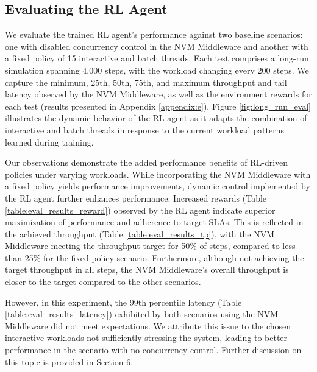 \subsection*{Evaluating the RL Agent}

We evaluate the trained RL agent's performance against two baseline scenarios: one with disabled concurrency control in the NVM Middleware and another with a fixed policy of 15 interactive and batch threads. Each test comprises a long-run simulation spanning 4,000 steps, with the workload changing every 200 steps. We capture the minimum, 25th, 50th, 75th, and maximum throughput and tail latency observed by the NVM Middleware, as well as the environment rewards for each test (results presented in Appendix \ref{appendix:e}). Figure \ref{fig:long_run_eval} illustrates the dynamic behavior of the RL agent as it adapts the combination of interactive and batch threads in response to the current workload patterns learned during training.

Our observations demonstrate the added performance benefits of RL-driven policies under varying workloads. While incorporating the NVM Middleware with a fixed policy yields performance improvements, dynamic control implemented by the RL agent further enhances performance. Increased rewards (Table \ref{table:eval_results_reward}) observed by the RL agent indicate superior maximization of performance and adherence to target SLAs. This is reflected in the achieved throughput (Table \ref{table:eval_results_tp}), with the NVM Middleware meeting the throughput target for 50\% of steps, compared to less than 25\% for the fixed policy scenario. Furthermore, although not achieving the target throughput in all steps, the NVM Middleware's overall throughput is closer to the target compared to the other scenarios.

However, in this experiment, the 99th percentile latency (Table \ref{table:eval_results_latency}) exhibited by both scenarios using the NVM Middleware did not meet expectations. We attribute this issue to the chosen interactive workloads not sufficiently stressing the system, leading to better performance in the scenario with no concurrency control. Further discussion on this topic is provided in Section 6.




